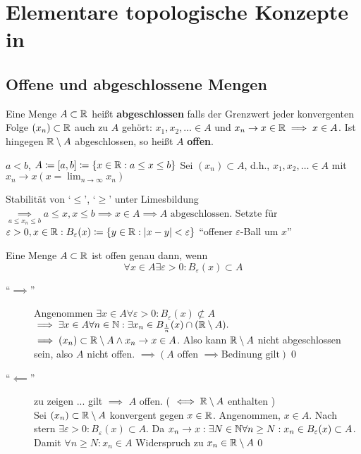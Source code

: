\section{Elementare topologische Konzepte in }
\subsection{Offene und abgeschlossene Mengen}
\begin{subdefinition}
	Eine Menge $ A \subset \mathbb{R} $ heißt \textbf{abgeschlossen} falls der Grenzwert jeder konvergenten Folge $ (x_n) \subset \mathbb{R} $ auch zu $ A $ gehört: $ x_1, x_2, \dotsc \in A $ und $ x_n \to x \in \mathbb{R} \implies x \in A $. Ist hingegen $ \mathbb{R}\setminus A $ abgeschlossen, so heißt $ A $ \textbf{offen}.
\end{subdefinition}

\begin{subexample}
	$ a < b $, $ A \coloneqq [a, b] \coloneqq \{ x \in \mathbb{R} : a \leq x \leq b \} $
	Sei $ (x_n) \subset A $, d.h., $ x_1, x_2, \dotsc \in A $ mit $ x_n \to x ( x = \lim_{n\to\infty} x_n ) $
\end{subexample}
Stabilität von `$\leq$', `$\geq$' unter Limesbildung $ \underset{a\leq x_n \leq b }{\implies} a \leq x, x \leq b \implies x \in A \implies A \text{ abgeschlossen} $.
Setzte für $ \varepsilon > 0, x \in \mathbb{R}: B_{\varepsilon}(x) \coloneqq \{ y \in \mathbb{R} : | x - y | < \varepsilon \} $ ``offener $\varepsilon$-Ball um $x$''

\begin{sublemma}
	Eine Menge $ A \subset \mathbb{R} $ ist offen genau dann, wenn
	\[ \forall x \in A \exists \varepsilon > 0 : B_{\varepsilon} (x) \subset A \]
\end{sublemma}

\begin{subproof*}
	\begin{description}
		\item[``$\implies$''] Angenommen $ \exists x \in A \forall \varepsilon > 0 : B_{\varepsilon}(x) \not\subset A $\\
			$\implies \exists x \in A \forall n \in \mathbb{N} : \exists x_n \in B_{\frac{1}{n}}(x) \cap ( \mathbb{R} \setminus A ).$
			$\implies (x_n) \subset \mathbb{R} \setminus A \wedge x_n \to x \in A $. Also kann $ \mathbb{R} \setminus A $ nicht abgeschlossen sein, also $A $ nicht offen. $ \implies ( A \text{ offen } \implies \text{Bedinung gilt} ) $\qed
		\item[``$ \impliedby $''] zu zeigen ... gilt $ \implies $ $ A $ offen. ( $ \iff \mathbb{R}\setminus A $ enthalten )\\
			Sei $ (x_{n}) \subset \mathbb{R} \setminus A $ konvergent gegen $ x \in  \mathbb{R} $. Angenommen, $ x \in  A $. Nach stern $ \exists \varepsilon > 0 : B_{\varepsilon}(x) \subset A $. Da $  x_{n} \to x: \exists N \in  \mathbb{N} \forall n\geq N: x_{n} \in B_{\varepsilon}(x) \subset A $. Damit $ \forall n \geq N: x_{n} \in A $ Widerspruch zu $ x_{n} \in \mathbb{R} \setminus A $\qed
	\end{description}
\end{subproof*}


